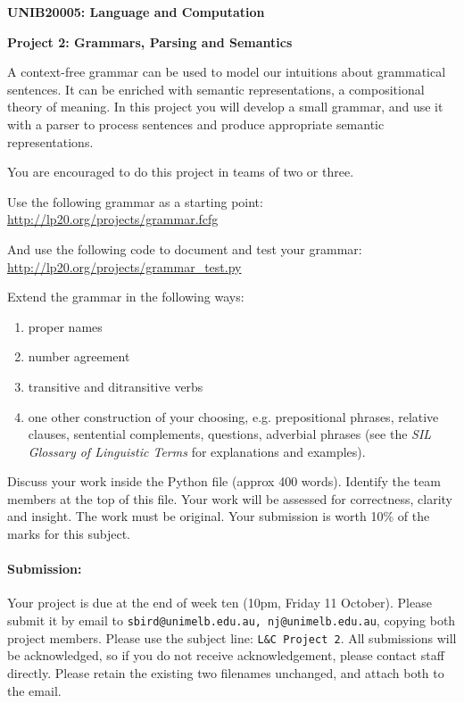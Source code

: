 \documentclass[a4paper,10pt]{article}
\begin{document}
\centerline{\LARGE\bf UNIB20005: Language and Computation}\vspace{2ex}

\centerline{\large\bf Project 2: Grammars, Parsing and Semantics}\vspace{2ex}

A context-free grammar can be used to model our intuitions about grammatical sentences.
It can be enriched with semantic representations, a compositional theory of meaning.
In this project you will develop a small grammar, and use it with a parser to
process sentences and produce appropriate semantic representations.

You are encouraged to do this project in teams of two or three.

Use the following grammar as a starting point:
\url{http://lp20.org/projects/grammar.fcfg}

And use the following code to document and test your grammar:
\url{http://lp20.org/projects/grammar_test.py}

Extend the grammar in the following ways:

\begin{enumerate}
\item proper names
\item number agreement
\item transitive and ditransitive verbs
\item one other construction of your choosing, e.g. prepositional phrases, relative clauses, sentential complements, questions, adverbial phrases (see the \emph{SIL Glossary of Linguistic Terms} for explanations
and examples).
\end{enumerate}

Discuss your work inside the Python file (approx 400 words).
Identify the team members at the top of this file.
Your work will be assessed for correctness, clarity and insight. 
The work must be original.
Your submission is worth 10\% of the marks for this subject.

\paragraph{Submission:}
Your project is due at the end of week ten (10pm, Friday 11 October). Please submit it by email to
\texttt{sbird@unimelb.edu.au, nj@unimelb.edu.au}, copying both project members. Please use the subject line: \texttt{L\&C Project 2}.
All submissions will be acknowledged, so if you do not receive acknowledgement, please contact staff directly.
Please retain the existing two filenames unchanged, and attach both to the email.
\end{document}
